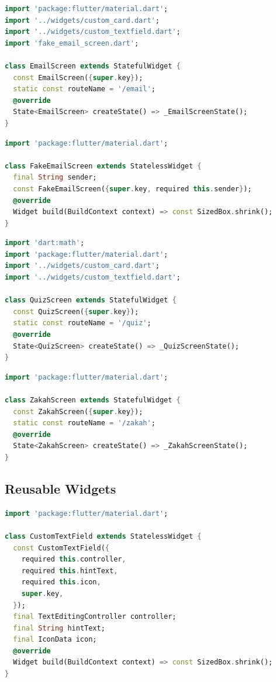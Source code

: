 \documentclass{article}
\begin{document}
\begin{lstlisting}[language=Dart, caption={\texttt{\detokenize{lib/screens/email_screen.dart}}}]
import 'package:flutter/material.dart';
import '../widgets/custom_card.dart';
import '../widgets/custom_textfield.dart';
import 'fake_email_screen.dart';

class EmailScreen extends StatefulWidget {
  const EmailScreen({super.key});
  static const routeName = '/email';
  @override
  State<EmailScreen> createState() => _EmailScreenState();
}
\end{lstlisting}

\begin{lstlisting}[language=Dart, caption={\texttt{\detokenize{lib/screens/fake_email_screen.dart}}}]
import 'package:flutter/material.dart';

class FakeEmailScreen extends StatelessWidget {
  final String sender;
  const FakeEmailScreen({super.key, required this.sender});
  @override
  Widget build(BuildContext context) => const SizedBox.shrink();
}
\end{lstlisting}

\begin{lstlisting}[language=Dart, caption={\texttt{\detokenize{lib/screens/quiz_screen.dart}}}]
import 'dart:math';
import 'package:flutter/material.dart';
import '../widgets/custom_card.dart';
import '../widgets/custom_textfield.dart';

class QuizScreen extends StatefulWidget {
  const QuizScreen({super.key});
  static const routeName = '/quiz';
  @override
  State<QuizScreen> createState() => _QuizScreenState();
}
\end{lstlisting}

\begin{lstlisting}[language=Dart, caption={\texttt{\detokenize{lib/screens/zakah_screen.dart}}}]
import 'package:flutter/material.dart';

class ZakahScreen extends StatefulWidget {
  const ZakahScreen({super.key});
  static const routeName = '/zakah';
  @override
  State<ZakahScreen> createState() => _ZakahScreenState();
}
\end{lstlisting}

\subsection*{Reusable Widgets}
\begin{lstlisting}[language=Dart, caption={\texttt{\detokenize{lib/widgets/custom_textfield.dart}}}]
import 'package:flutter/material.dart';

class CustomTextField extends StatelessWidget {
  const CustomTextField({
    required this.controller,
    required this.hintText,
    required this.icon,
    super.key,
  });
  final TextEditingController controller;
  final String hintText;
  final IconData icon;
  @override
  Widget build(BuildContext context) => const SizedBox.shrink();
}
\end{lstlisting}
\end{document}
